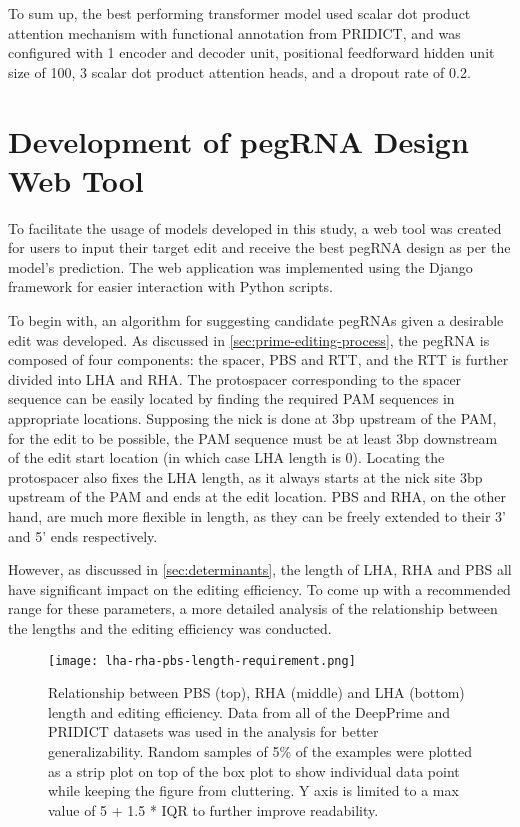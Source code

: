 To sum up, the best performing transformer model used scalar dot product attention mechanism with functional annotation from PRIDICT, and was configured with 1 encoder and decoder unit, positional feedforward hidden unit size of 100, 3 scalar dot product attention heads, and a dropout rate of 0.2. 

\section{Development of pegRNA Design Web Tool}

To facilitate the usage of models developed in this study, a web tool was created for users to input their target edit and receive the best pegRNA design as per the model's prediction. The web application was implemented using the Django framework for easier interaction with Python scripts. 

To begin with, an algorithm for suggesting candidate pegRNAs given a desirable edit was developed. As discussed in \autoref{sec:prime-editing-process}, the pegRNA is composed of four components: the spacer, PBS and RTT, and the RTT is further divided into LHA and RHA. The protospacer corresponding to the spacer sequence can be easily located by finding the required PAM sequences in appropriate locations.
Supposing the nick is done at 3bp upstream of the PAM, for the edit to be possible, the PAM sequence must be at least 3bp downstream of the edit start location (in which case LHA length is 0). Locating the protospacer also fixes the LHA length, as it always starts at the nick site 3bp upstream of the PAM and ends at the edit location. PBS and RHA, on the other hand, are much more flexible in length, as they can be freely extended to their 3' and 5' ends respectively.

However, as discussed in \autoref{sec:determinants}, the length of LHA, RHA and PBS all have significant impact on the editing efficiency. To come up with a recommended range for these parameters, a more detailed analysis of the relationship between the lengths and the editing efficiency was conducted.

\begin{figure}
    \texttt{[image: lha-rha-pbs-length-requirement.png]}
    \caption[Relationship between LHA, RHA and PBS length and editing efficiency]{Relationship between PBS (top), RHA (middle) and LHA (bottom) length and editing efficiency. Data from all of the DeepPrime and PRIDICT datasets was used in the analysis for better generalizability. Random samples of 5\% of the examples were plotted as a strip plot on top of the box plot to show individual data point while keeping the figure from cluttering. Y axis is limited to a max value of 5 + 1.5 * IQR to further improve readability. }
    \label{fig:lha-rha-pbs-length}
\end{figure}


